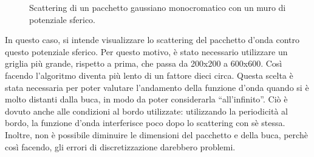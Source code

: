 \begin{figure}[!h]
 \centering
  
 \caption{\small{Scattering di un pacchetto gaussiano monocromatico con un muro di potenziale sferico.}}
 \end{figure}
 In questo caso, si intende visualizzare lo scattering del pacchetto d'onda contro questo potenziale sferico.
Per questo motivo, è stato necessario utilizzare un griglia più grande, rispetto a prima,
che passa da 200x200 a 600x600. Così facendo l'algoritmo diventa più lento di un fattore dieci circa.
Questa scelta è stata necessaria per poter
valutare l'andamento della funzione d'onda quando si è molto distanti dalla buca, in modo da poter considerarla ``all'infinito''. 
Ciò è dovuto anche alle condizioni al bordo utilizzate: utilizzando la periodicità al bordo, la funzione d'onda interferisce poco dopo lo scattering
con sè stessa. Inoltre, non è possibile diminuire le dimensioni del pacchetto e della buca, perchè così facendo,
gli errori di discretizzazione darebbero problemi.
